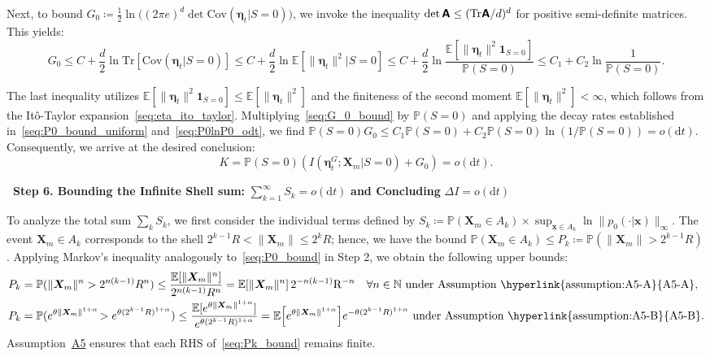 Next, to bound $G_0\coloneq\frac{1}{2}\ln\!\big((2\pi e)^d\det\mathrm{Cov}(\bm\eta_t|S=0)\big)$, we invoke the inequality $\det\boldsymbol{\mathsf{A}}\leq(\mathrm{Tr}\boldsymbol{\mathsf{A}}/d)^d$ for positive semi-definite matrices. This yields:
\begin{equation}
    G_0\leq
    C+\frac{d}{2}\ln\mathrm{Tr}[\mathrm{Cov}(\bm\eta_t|S=0)]
    \leq
    C+\frac{d}{2}\ln\mathbb E[\|\bm\eta_t\|^2|S=0]
    \leq
    C+\frac{d}{2}\ln\frac{\mathbb E[\|\bm\eta_t\|^2\bm1_{S=0}]}{\mathbb P(S=0)}
    \leq
    C_1+C_2\ln\frac{1}{\mathbb P(S=0)}.
    \label{seq:G_0_bound}
\end{equation}

The last inequality utilizes $\mathbb E[\|\bm\eta_t\|^2\bm1_{S=0}]\leq\mathbb E[\|\bm\eta_t\|^2]$ and the finiteness of the second moment $\mathbb E[\|\bm\eta_t\|^2]<\infty$, which follows from the Itô-Taylor expansion~\eqref{seq:eta_ito_taylor}. Multiplying~\eqref{seq:G_0_bound} by $\mathbb P(S=0)$ and applying the decay rates established in~\eqref{seq:P0_bound_uniform} and~\eqref{seq:P0lnP0_odt}, we find $\mathbb P(S=0)G_0 \leq C_1\mathbb P(S=0)+C_2\mathbb P(S=0)\ln(1/\mathbb P(S=0))=o(\mathrm dt)$. Consequently, we arrive at the desired conclusion:
\begin{equation}
    K=\mathbb P(S=0)(I(\bm\eta_t^G;\bm X_m|S=0)+G_0)=o(\mathrm dt).
    \label{seq:K_odt}
\end{equation}

\bigskip
\noindent\textbf{\textbullet\ Step 6. Bounding the Infinite Shell sum:} $\sum_{k=1}^\infty S_k=o(\mathrm dt)$ \textbf{and Concluding} $\Delta I=o(\mathrm dt)$

To analyze the total sum $\sum_k S_k$, we first consider the individual terms defined by $S_k\coloneq\mathbb P(\bm X_m\in A_k)\times\sup_{\bm x\in A_k}\!\ln\|p_0(\cdot|\bm x)\|_\infty$. The event $\bm X_m\in A_k$ corresponds to the shell $2^{k-1}R<\|\bm X_m\|\leq 2^k R$; hence, we have the bound $\mathbb P(\bm X_m\in A_k)\leq P_k\coloneq\mathbb P(\|\bm X_m\|>2^{k-1}R)$. Applying Markov's inequality analogously to~\eqref{seq:P0_bound} in Step 2, we obtain the following upper bounds:
\begin{subequations}\label{seq:Pk_bound}
\renewcommand{\theequation}{\theparentequation-\Alph{equation}}
\begin{align}
    P_k&=\mathbb P(\|\bm X_m\|^n>2^{n(k-1)}R^n)
    \leq\frac{\mathbb E[\|\bm X_m\|^n]}{2^{n(k-1)}R^n}
    =\mathbb E[\|\bm X_m\|^n]\,2^{-n(k-1)}\mathrm R^{-n}
    \quad\forall n\in\mathbb N
    \text{ under Assumption~\hyperlink{assumption:A5-A}{A5-A}},
    \label{seq:Pk_bound_A}
    \\
    P_k&=\mathbb P(e^{\theta\|\bm X_m\|^{1+\alpha}}\!>e^{\theta (2^{k-1}R)^{1+\alpha}})
    \leq\frac{\mathbb E[e^{\theta\|\bm X_m\|^{1+\alpha}}]}{e^{\theta (2^{k-1}R)^{1+\alpha}}}
    =\mathbb E\!\left[e^{\theta\|\bm X_m\|^{1+\alpha}}\right]
    \!e^{-\theta (2^{k-1}R)^{1+\alpha}}
    \text{ under Assumption~\hyperlink{assumption:A5-B}{A5-B}}.
    \label{seq:Pk_bound_B}
\end{align}
\end{subequations}
Assumption~\hyperlink{assumption:A5}{A5} ensures that each RHS of~\eqref{seq:Pk_bound} remains finite.

